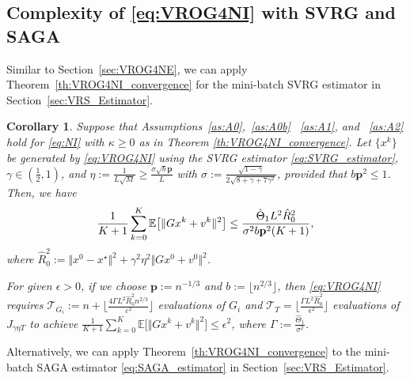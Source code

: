 \documentclass{article}
\newcommand{\sets}[1]{\{#1\}}
\newcommand{\norms}[1]{\Vert#1\Vert}
\newcommand{\Expk}[1]{\mathbb{E}\big[#1\big]}
\newcommand{\Tc}{\mathcal{T}}
\newcommand{\mbf}[1]{\mathbf{#1}}
\newcommand{\beforesubsec}{\vspace{-1.5ex}}
\newcommand{\aftersubsec}{\vspace{-1.5ex}}
\theoremstyle{plain}
\newtheorem{corollary}[theorem]{Corollary}
\theoremstyle{definition}
\theoremstyle{remark}
\begin{document}
\beforesubsec
\subsection{Complexity of \ref{eq:VROG4NI} with SVRG and SAGA {\!\!\!}}\label{subsec:VROG2_oracle_complexity}
\aftersubsec
\vspace{0.5ex}
Similar to Section~\ref{sec:VROG4NE}, we can apply Theorem~\ref{th:VROG4NI_convergence} for the mini-batch SVRG estimator in Section~\ref{sec:VRS_Estimator}.

\begin{corollary}\label{co:VROG2_SVRG_convergence1_v2}
Suppose that Assumptions~\ref{as:A0},~\ref{as:A0b} ~\ref{as:A1}, and ~\ref{as:A2} hold for \eqref{eq:NI} with $\kappa \geq 0$ as in Theorem \ref{th:VROG4NI_convergence}.
Let $\sets{x^k}$ be generated by \eqref{eq:VROG4NI} using the SVRG estimator \eqref{eq:SVRG_estimator}, $\gamma \in \left( \frac{1}{2}, 1\right)$, and $\eta := \frac{1}{L\sqrt{M}} \geq \frac{\sigma \sqrt{b}\mbf{p}}{L}$ with $\sigma := \frac{\sqrt{1-\gamma}}{2\sqrt{8+\gamma+7\gamma^2}}$, provided that $b\mbf{p}^2 \leq 1$.
Then, we have
\vspace{-0.75ex}
\begin{equation}\label{eq:svrg_bound_for_NI} 
\frac{1}{K+1}\sum_{k=0}^{K} \Expk{ \norms{Gx^{k} + v^k}^2 }   \leq     \frac{ \hat{\Theta}_1 L^2 \hat{R}^2_0 }{\sigma^2 b\mbf{p}^2 (K + 1)}, 
\vspace{-0.75ex}
\end{equation}
where $\hat{R}^2_0 := \norms{x^0 - x^{\star}}^2 + \gamma^2\eta^2 \norms{Gx^0 + v^0}^2$.

For given $\epsilon > 0$, if we choose $\mbf{p} := n^{-1/3}$ and $b := \lfloor n^{2/3} \rfloor$, then \eqref{eq:VROG4NI} requires $\Tc_{G_i} := n + \big\lfloor \frac{4\Gamma L^2\hat{R}^2_0 n^{2/3}}{\varepsilon^2} \big\rfloor$ evaluations of $G_i$ and $\Tc_{T} = \big\lfloor  \frac{\Gamma L^2 \hat{R}_0^2 }{ \epsilon^2 } \big\rfloor$ evaluations of $J_{\gamma\eta T}$ to achieve $\frac{1}{K+1}\sum_{k=0}^{K} \Expk{ \norms{Gx^{k} \! + \! v^k}^2 } \leq \epsilon^2$, where $\Gamma := \frac{\hat{\Theta}_1}{\sigma^2}$.
\end{corollary}

Alternatively, we can apply Theorem~\ref{th:VROG4NI_convergence} to the mini-batch SAGA estimator \eqref{eq:SAGA_estimator} in Section~\ref{sec:VRS_Estimator}.
\end{document}
